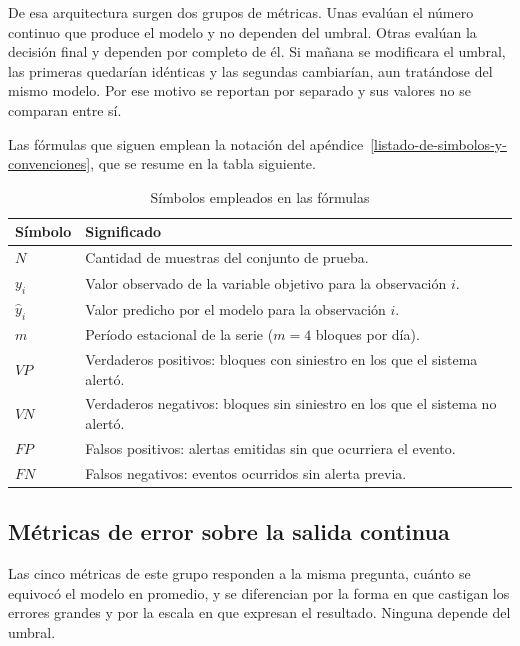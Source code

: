 De esa arquitectura surgen dos grupos de métricas. Unas evalúan el número continuo que produce el modelo y no dependen del umbral. Otras evalúan la decisión final y dependen por completo de él. Si mañana se modificara el umbral, las primeras quedarían idénticas y las segundas cambiarían, aun tratándose del mismo modelo. Por ese motivo se reportan por separado y sus valores no se comparan entre sí.

Las fórmulas que siguen emplean la notación del apéndice~\ref{listado-de-simbolos-y-convenciones}, que se resume en la tabla siguiente.

\begin{table}[htbp]
\centering
\caption{Símbolos empleados en las fórmulas}
\label{tab:simbolos-formulas}
\begin{tabularx}{\linewidth}{@{}lX@{}}
\toprule
\textbf{Símbolo} & \textbf{Significado} \\
\midrule
$N$ & Cantidad de muestras del conjunto de prueba. \\
$y_i$ & Valor observado de la variable objetivo para la observación $i$. \\
$\hat{y}_i$ & Valor predicho por el modelo para la observación $i$. \\
$m$ & Período estacional de la serie ($m = 4$ bloques por día). \\
$VP$ & Verdaderos positivos: bloques con siniestro en los que el sistema alertó. \\
$VN$ & Verdaderos negativos: bloques sin siniestro en los que el sistema no alertó. \\
$FP$ & Falsos positivos: alertas emitidas sin que ocurriera el evento. \\
$FN$ & Falsos negativos: eventos ocurridos sin alerta previa. \\
\bottomrule
\end{tabularx}
\end{table}

\subsection{Métricas de error sobre la salida continua}

Las cinco métricas de este grupo responden a la misma pregunta, cuánto se equivocó el modelo en promedio, y se diferencian por la forma en que castigan los errores grandes y por la escala en que expresan el resultado. Ninguna depende del umbral.

